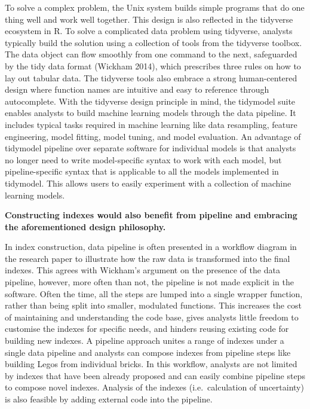 \documentclass[
]{interact}
\begin{document}
To solve a complex problem, the Unix system builds simple programs that
do one thing well and work well together. This design is also reflected
in the tidyverse ecosystem in R. To solve a complicated data problem
using tidyverse, analysts typically build the solution using a
collection of tools from the tidyverse toolbox. The data object can flow
smoothly from one command to the next, safeguarded by the tidy data
format (Wickham 2014), which prescribes three rules on how to lay out
tabular data. The tidyverse tools also embrace a strong human-centered
design where function names are intuitive and easy to reference through
autocomplete. With the tidyverse design principle in mind, the tidymodel
suite enables analysts to build machine learning models through the data
pipeline. It includes typical tasks required in machine learning like
data resampling, feature engineering, model fitting, model tuning, and
model evaluation. An advantage of tidymodel pipeline over separate
software for individual models is that analysts no longer need to write
model-specific syntax to work with each model, but pipeline-specific
syntax that is applicable to all the models implemented in tidymodel.
This allows users to easily experiment with a collection of machine
learning models.

\textbf{Constructing indexes would also benefit from pipeline and
embracing the aforementioned design philosophy.}

In index construction, data pipeline is often presented in a workflow
diagram in the research paper to illustrate how the raw data is
transformed into the final indexes. This agrees with Wickham's argument
on the presence of the data pipeline, however, more often than not, the
pipeline is not made explicit in the software. Often the time, all the
steps are lumped into a single wrapper function, rather than being split
into smaller, modulated functions. This increases the cost of
maintaining and understanding the code base, gives analysts little
freedom to customise the indexes for specific needs, and hinders reusing
existing code for building new indexes. A pipeline approach unites a
range of indexes under a single data pipeline and analysts can compose
indexes from pipeline steps like building Legos from individual bricks.
In this workflow, analysts are not limited by indexes that have been
already proposed and can easily combine pipeline steps to compose novel
indexes. Analysis of the indexes (i.e.~calculation of uncertainty) is
also feasible by adding external code into the pipeline.
\end{document}
